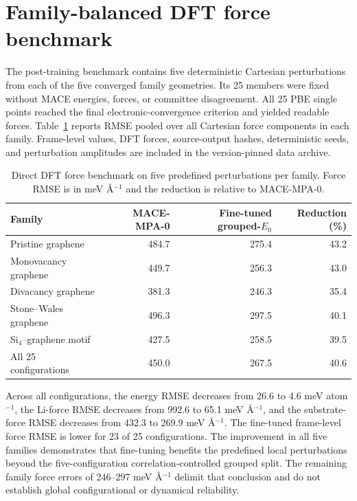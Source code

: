 \documentclass[11pt]{article}
\begin{document}
\section{Family-balanced DFT force benchmark}

The post-training benchmark contains five deterministic Cartesian perturbations
from each of the five converged family geometries. Its 25 members were fixed
without MACE energies, forces, or committee disagreement. All 25 PBE single
points reached the final electronic-convergence criterion and yielded readable
forces. Table~\ref{tab:si_balanced_force} reports RMSE pooled over all Cartesian
force components in each family. Frame-level values, DFT forces, source-output
hashes, deterministic seeds, and perturbation amplitudes are included in the
version-pinned data archive.

\begin{table}[H]
  \centering
  \caption{Direct DFT force benchmark on five predefined perturbations per
  family. Force RMSE is in meV \AA$^{-1}$ and the reduction is relative to
  MACE-MPA-0.}
  \label{tab:si_balanced_force}
  \begin{tabular}{lrrr}
    \toprule
    Family & MACE-MPA-0 & Fine-tuned grouped-$E_0$ & Reduction (\%) \\
    \midrule
    Pristine graphene & 484.7 & 275.4 & 43.2 \\
    Monovacancy graphene & 449.7 & 256.3 & 43.0 \\
    Divacancy graphene & 381.3 & 246.3 & 35.4 \\
    Stone--Wales graphene & 496.3 & 297.5 & 40.1 \\
    Si$_4$--graphene motif & 427.5 & 258.5 & 39.5 \\
    \midrule
    All 25 configurations & 450.0 & 267.5 & 40.6 \\
    \bottomrule
  \end{tabular}
\end{table}

Across all configurations, the energy RMSE decreases from 26.6 to
4.6 meV atom$^{-1}$, the Li-force RMSE decreases from 992.6 to
65.1 meV \AA$^{-1}$, and the substrate-force RMSE decreases from 432.3 to
269.9 meV \AA$^{-1}$. The fine-tuned frame-level force RMSE is lower for 23 of
25 configurations. The improvement in all five families demonstrates that
fine-tuning benefits the predefined local perturbations beyond the
five-configuration correlation-controlled grouped split. The remaining family force errors of
246--297 meV \AA$^{-1}$ delimit that conclusion and do not establish global
configurational or dynamical reliability.
\end{document}
